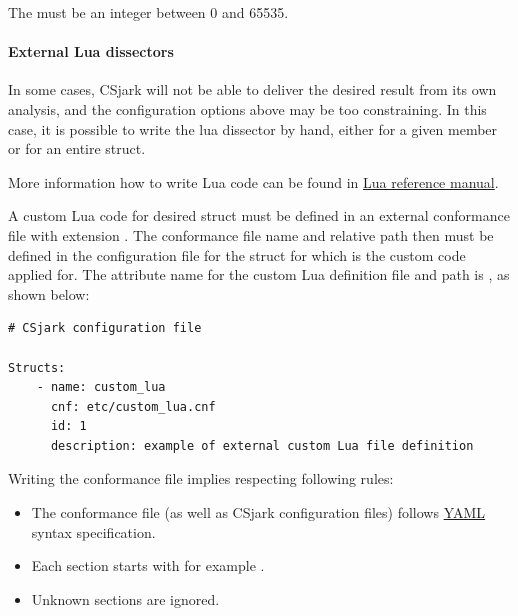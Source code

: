 \documentclass[A4paper,10pt,english]{sphinxmanual}
\begin{document}
The  must be an integer between 0 and 65535.


\paragraph{External Lua dissectors}
\label{user/config:external-lua-dissectors}
In some cases, CSjark will not be able to deliver the desired result from its own analysis, and the configuration options above may be too constraining. In this case, it is possible to write the lua dissector by hand, either for a given member or for an entire struct.

More information how to write Lua code can be found in \href{http://www.lua.org/manual/5.1/}{Lua reference manual}.

A custom Lua code for desired struct must be defined in an external conformance file with extension . The conformance file name and relative path then must be defined in the configuration file for the struct for which is the custom code applied for. The attribute name for the custom Lua definition file and path is , as shown below:

\begin{Verbatim}[commandchars=\\\{\}]
# CSjark configuration file

Structs:
    - name: custom_lua
      cnf: etc/custom_lua.cnf
      id: 1
      description: example of external custom Lua file definition
\end{Verbatim}

Writing the conformance file implies respecting following rules:
\begin{itemize}
\item {} 
The conformance file (as well as CSjark configuration files) follows \href{http://www.yaml.org/}{YAML} syntax specification.

\item {} 
Each section starts with  for example .

\item {} 
Unknown sections are ignored.

\end{itemize}
\end{document}
